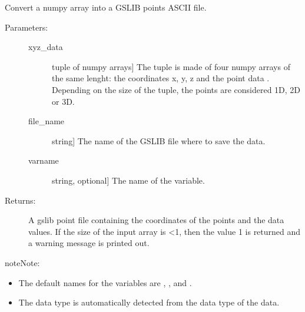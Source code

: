 \documentclass[letterpaper,10pt,english]{sphinxmanual}
\begin{document}

\begin{fulllineitems}
\label{\detokenize{appendices:s2Dcd.gslibnumpy.numpy2gslib_points}}
Convert a numpy array into a GSLIB points ASCII file.
\begin{description}
\item[{Parameters:}] \leavevmode\begin{description}
\item[{xyz\_data}] \leavevmode{[}tuple of numpy arrays{]}
The tuple is made of four numpy arrays of the same lenght:
the coordinates x, y, z and the point data .
Depending on the size of the tuple, the points are considered
1D, 2D or 3D.

\item[{file\_name}] \leavevmode{[}string{]}
The name of the GSLIB file where to save the data.

\item[{varname}] \leavevmode{[}string, optional{]}
The name of the variable.

\end{description}

\item[{Returns:}] \leavevmode
A gslib point file containing the coordinates of the points
and the data values.  If the size of the input array is \textless{}1,
then the value \sphinxhyphen{}1 is returned and a warning message is printed
out.

\end{description}

\begin{sphinxadmonition}{note}{Note:}\begin{itemize}
\item {} 
The default names for the variables are , ,  and .

\item {} 
The data type is automatically detected from the data type of the 
data.

\end{itemize}
\end{sphinxadmonition}

\end{fulllineitems}
\end{document}
